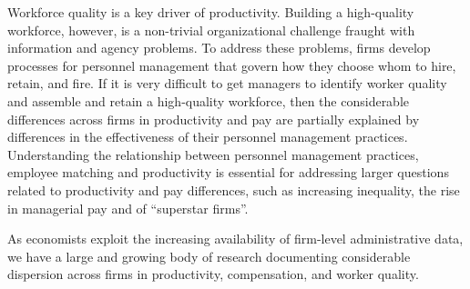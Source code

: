 Workforce quality is a key driver of productivity. 
Building a high-quality workforce, however, is a non-trivial organizational challenge fraught with information and agency problems. To address these problems, firms develop processes for personnel management that govern how they choose whom to hire, retain, and fire. 
If it is very difficult to get managers to identify worker quality and assemble and retain a high-quality workforce, then the considerable differences across firms in productivity and pay are partially explained by differences in the effectiveness of their personnel management practices. 
Understanding the relationship between personnel management practices, employee matching and productivity is essential for addressing larger questions related to productivity and pay differences, such as increasing inequality, the rise in managerial pay and of ``superstar firms''. 


As economists exploit the increasing availability of firm-level administrative data, we have a large and growing body of research documenting considerable dispersion across firms in productivity, compensation, and worker quality. 




 
